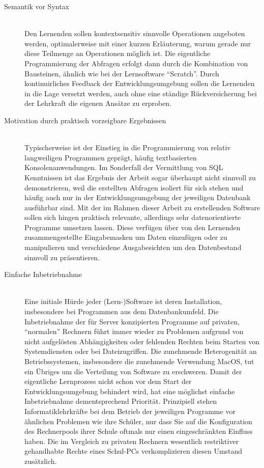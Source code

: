 \begin{description}
\item[Semantik vor Syntax] \hfill\\
  Den Lernenden sollen kontextsensitiv sinnvolle Operationen angeboten werden, optimalerweise mit einer kurzen Erläuterung, warum gerade nur diese Teilmenge an Operationen möglich ist. Die eigentliche Programmierung der Abfragen erfolgt dann durch die Kombination von Bausteinen, ähnlich wie bei der Lernsoftware ``Scratch''. Durch kontinuirliches Feedback der Entwicklungsumgebung sollen die Lernenden in die Lage versetzt werden, auch ohne eine ständige Rückversicherung bei der Lehrkraft die eigenen Ansätze zu erproben.
\item[Motivation durch praktisch vorzeigbare Ergebnissen] \hfill\\
  Typischerweise ist der Einstieg in die Programmierung von relativ langweiligen Programmen geprägt, häufig textbasierten Konsolenanwendungen. Im Sonderfall der Vermittlung von SQL Kenntnissen ist das Ergebnis der Arbeit sogar überhaupt nicht sinnvoll zu demonstrieren, weil die erstellten Abfragen isoliert für sich stehen und häufig auch nur in der Entwicklungsumgebung der jeweiligen Datenbank ausführbar sind. Mit der im Rahmen dieser Arbeit zu erstellenden Software sollen sich hingen praktisch relevante, allerdings sehr datenorientierte Programme umsetzen lassen. Diese verfügen über von den Lernenden zusammengestellte Eingabemasken um Daten einzufügen oder zu manipulieren und verschiedene Ausgabesichten um den Datenbestand sinnvoll zu präsentieren.
\item[Einfache Inbetriebnahme] \hfill \\
  Eine initiale Hürde jeder (Lern-)Software ist deren Installation, insbesondere bei Programmen aus dem Datenbankumfeld. Die Inbetriebnahme der für Server konzipierten Programme auf privaten, ``normalen'' Rechnern führt immer wieder zu Problemen aufgrund von nicht aufgelösten Abhängigkeiten oder fehlenden Rechten beim Starten von Systemdiensten oder bei Dateizugriffen. Die zunehmende Heterogenität an Betriebssystemen, insbesondere die zunehmende Verwendung MacOS, tut ein Übriges um die Verteilung von Software zu erschweren. Damit der eigentliche Lernprozess nicht schon vor dem Start der Entwicklungsumgebung behindert wird, hat eine möglichst einfache Inbetriebnahme dementsprechend Priorität. Prinzipiell stehen Informatiklehrkräfte bei dem Betrieb der jeweiligen Programme vor ähnlichen Problemen wie ihre Schüler, nur dass Sie auf die Konfiguration des Rechnerpools ihrer Schule oftmals nur einen eingeschränkten Einfluss haben. Die im Vergleich zu privaten Rechnern wesentlich restriktiver gehandhabte Rechte eines Schul-PCs verkomplizieren diesen Umstand zusätzlich.

\end{description}
